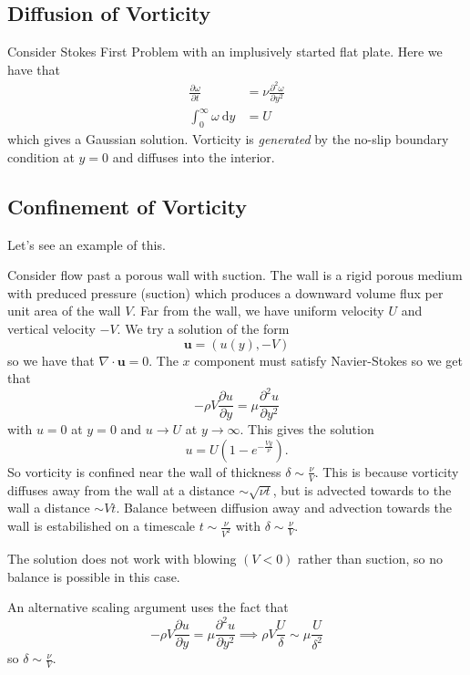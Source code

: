 \documentclass{article}
\begin{document}
\subsection{Diffusion of Vorticity}
Consider Stokes First Problem with an implusively started flat plate. Here we have that
\begin{align*}
	\frac{\partial \omega}{\partial t} &= \nu \frac{\partial^2 \omega}{\partial y^2} \\
	\int_0^\infty \omega \ \mathrm dy &= U
\end{align*}
which gives a Gaussian solution. Vorticity is \textit{generated} by the no-slip boundary condition at $ y=0 $ and diffuses into the interior.
\subsection{Confinement of Vorticity}
Let's see an example of this.
\begin{example}
  Consider flow past a porous wall with suction. The wall is a rigid porous medium with preduced pressure (suction) which produces a downward volume flux per unit area of the wall $ V $. Far from the wall, we have uniform velocity $ U $ and vertical velocity $ -V $. We try a solution of the form 
  \[
    \mathbf u = (u(y), -V)
  \]
  so we have that $ \nabla\cdot\mathbf u = 0 $. The $ x $ component must satisfy Navier-Stokes so we get that
  \[
	  -\rho V \frac{\partial u}{\partial y} = \mu \frac{\partial^2u}{\partial y^2}
  \]
  with $ u = 0 $ at $ y=0 $ and $ u\to U $ at $ y\to\infty $. This gives the solution
  \[
	  u = U\left(1-e^{-\frac{Vy}\nu}\right).
  \]
  So vorticity is confined near the wall of thickness $ \delta \sim \frac \nu V $. This is because vorticity diffuses away from the wall at a distance $ \sim \sqrt{\nu t} $, but is advected towards to the wall a distance $ \sim Vt $. Balance between diffusion away and advection towards the wall is estabilished on a timescale $ t\sim \frac \nu{V^2} $ with $ \delta \sim \frac \nu V $.
\end{example}
\begin{remark}
  The solution does not work with blowing $ (V < 0) $ rather than suction, so no balance is possible in this case.
\end{remark}
An alternative scaling argument uses the fact that
\[
	-\rho V \frac{\partial u}{\partial y} = \mu \frac{\partial^2 u}{\partial y^2}\implies \rho V \frac U \delta \sim \mu \frac U{\delta^2}
\]
so $ \delta \sim \frac \nu V $. 
\end{document}
